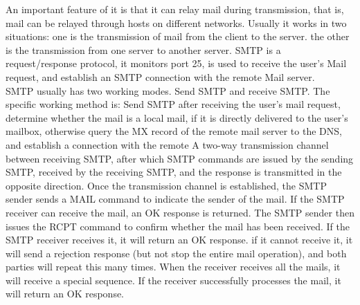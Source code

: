 An important feature of it is that it can relay mail during transmission, that is, mail can be relayed through hosts on different networks. Usually it works in two situations: one is the transmission of mail from the client to the server. the other is the transmission from one server to another server. SMTP is a request/response protocol, it monitors port 25, is used to receive the user's Mail request, and establish an SMTP connection with the remote Mail server.
\\
SMTP usually has two working modes. Send SMTP and receive SMTP. The specific working method is: Send SMTP after receiving the user's mail request, determine whether the mail is a local mail, if it is directly delivered to the user's mailbox, otherwise query the MX record of the remote mail server to the DNS, and establish a connection with the remote A two-way transmission channel between receiving SMTP, after which SMTP commands are issued by the sending SMTP, received by the receiving SMTP, and the response is transmitted in the opposite direction. Once the transmission channel is established, the SMTP sender sends a MAIL command to indicate the sender of the mail. If the SMTP receiver can receive the mail, an OK response is returned. The SMTP sender then issues the RCPT command to confirm whether the mail has been received. If the SMTP receiver receives it, it will return an OK response. if it cannot receive it, it will send a rejection response (but not stop the entire mail operation), and both parties will repeat this many times. When the receiver receives all the mails, it will receive a special sequence. If the receiver successfully processes the mail, it will return an OK response.
\\


